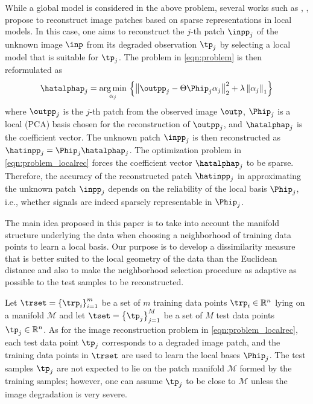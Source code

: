 \documentclass[journal]{IEEEtran}
\begin{document}
While a global model is considered in the above problem, several works such as \cite{Dong13nonlocally}, \cite{Dong11image}, \cite{Yu12solving} propose to reconstruct image patches based on sparse representations in local models. In this case, one aims to reconstruct the $j$-th patch $\inpp_j$ of the unknown image $\inp$ from its degraded observation $\tp_j$ by selecting a local model that is suitable for $\tp_j$. The problem in \eqref{eqn:problem} is then reformulated as
\begin{equation}
	\label{eqn:problem_localrec}
	\hatalphap_j=\underset{\alpha_j}{\operatorname{arg\,min}} \, \left\{ \left\|  \outpp_j -\Theta \Phip_j \alpha_j \right\|_{2}^{2} + \lambda \left\| \alpha_j \right\|_1\right\}
\end{equation}
where $\outpp_j$ is the $j$-th patch from the observed image $\outp$, $\Phip_j$ is a local (PCA) basis chosen for the reconstruction of $\outpp_j$, and $\hatalphap_j$ is the coefficient vector. The unknown patch $\inpp_j$ is then reconstructed as $\hatinpp_j= \Phip_j \hatalphap_j$. The optimization problem in \eqref{eqn:problem_localrec} forces the coefficient vector $\hatalphap_j$ to be sparse. Therefore, the accuracy of the reconstructed patch $\hatinpp_j$ in approximating the unknown patch $\inpp_j$ depends on the reliability of the local basis $\Phip_j$, i.e., whether signals are indeed sparsely representable in $\Phip_j$. 

The main idea proposed in this paper is to take into account the manifold structure underlying the data when choosing a neighborhood of training data points to learn a local basis. Our purpose is to develop a dissimilarity measure that is better suited to the local geometry of the data than the Euclidean distance and also to make the neighborhood selection procedure as adaptive as possible to the test samples to be reconstructed. 





Let $	\trset= \left\{\trp_i  \right\}_{i=1}^{m}$ be a set of $m$ training data points $\trp_i \in \mathbb{R}^n$ lying on a manifold $\mathcal{M}$ and let $	\tset =   \left\{\tp_j \right\}_{j=1}^{M}$ be a set of $M$ test data points $\tp_j \in\mathbb{R}^n $. As for the image reconstruction problem in \eqref{eqn:problem_localrec}, each test data point $\tp_j$ corresponds to a degraded image patch, and the training data points in $\trset$ are used to learn the local bases $\Phip_j$. The test samples $\tp_j$ are not expected to lie on the  patch manifold $\mathcal{M}$ formed by the training samples; however, one can assume $\tp_j$ to be close to $\mathcal{M}$ unless the image degradation is very severe.
\end{document}
